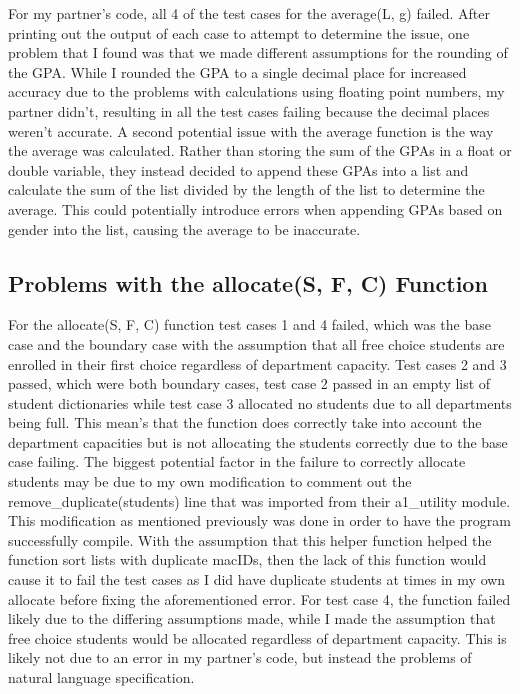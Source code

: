 \documentclass[12pt]{article}
\begin{document}
For my partner's code, all 4 of the test cases for the average(L, g) failed. After printing out the output of each case to attempt to determine the issue, one problem that I found was that we made different assumptions for the rounding of the GPA. While I rounded the GPA to a single decimal place for increased accuracy due to the problems with calculations using floating point numbers, my partner didn't, resulting in all the test cases failing because the decimal places weren't accurate. A second potential issue with the average function is the way the average was calculated. Rather than storing the sum of the GPAs in a float or double variable, they instead decided to append these GPAs into a list and calculate the sum of the list divided by the length of the list to determine the average. This could potentially introduce errors when appending GPAs based on gender into the list, causing the average to be inaccurate.

\subsection{Problems with the allocate(S, F, C) Function}

For the allocate(S, F, C) function test cases 1 and 4 failed, which was the base case and the boundary case with the assumption that all free choice students are enrolled in their first choice regardless of department capacity. Test cases 2 and 3 passed, which were both boundary cases, test case 2 passed in an empty list of student dictionaries while test case 3 allocated no students due to all departments being full. This mean's that the function does correctly take into account the department capacities but is not allocating the students correctly due to the base case failing. The biggest potential factor in the failure to correctly allocate students may be due to my own modification to comment out the remove\_duplicate(students) line that was imported from their a1\_utility module. This modification as mentioned previously was done in order to have the program successfully compile. With the assumption that this helper function helped the function sort lists with duplicate macIDs, then the lack of this function would cause it to fail the test cases as I did have duplicate students at times in my own allocate before fixing the aforementioned error. For test case 4, the function failed likely due to the differing assumptions made, while I made the assumption that free choice students would be allocated regardless of department capacity. This is likely not due to an error in my partner's code, but instead the problems of natural language specification.
\end{document}
